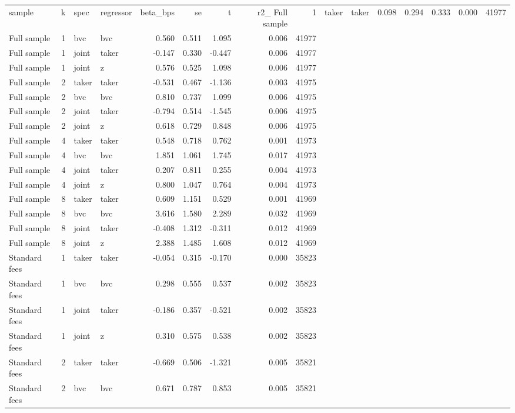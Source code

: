 \begin{tabular}{lrllrrrrr}
\toprule
sample & k & spec & regressor & beta_bps & se & t & r2_%
\midrule
Full sample & 1 & taker & taker & 0.098 & 0.294 & 0.333 & 0.000 & 41977 \\
Full sample & 1 & bvc & bvc & 0.560 & 0.511 & 1.095 & 0.006 & 41977 \\
Full sample & 1 & joint & taker & -0.147 & 0.330 & -0.447 & 0.006 & 41977 \\
Full sample & 1 & joint & z & 0.576 & 0.525 & 1.098 & 0.006 & 41977 \\
Full sample & 2 & taker & taker & -0.531 & 0.467 & -1.136 & 0.003 & 41975 \\
Full sample & 2 & bvc & bvc & 0.810 & 0.737 & 1.099 & 0.006 & 41975 \\
Full sample & 2 & joint & taker & -0.794 & 0.514 & -1.545 & 0.006 & 41975 \\
Full sample & 2 & joint & z & 0.618 & 0.729 & 0.848 & 0.006 & 41975 \\
Full sample & 4 & taker & taker & 0.548 & 0.718 & 0.762 & 0.001 & 41973 \\
Full sample & 4 & bvc & bvc & 1.851 & 1.061 & 1.745 & 0.017 & 41973 \\
Full sample & 4 & joint & taker & 0.207 & 0.811 & 0.255 & 0.004 & 41973 \\
Full sample & 4 & joint & z & 0.800 & 1.047 & 0.764 & 0.004 & 41973 \\
Full sample & 8 & taker & taker & 0.609 & 1.151 & 0.529 & 0.001 & 41969 \\
Full sample & 8 & bvc & bvc & 3.616 & 1.580 & 2.289 & 0.032 & 41969 \\
Full sample & 8 & joint & taker & -0.408 & 1.312 & -0.311 & 0.012 & 41969 \\
Full sample & 8 & joint & z & 2.388 & 1.485 & 1.608 & 0.012 & 41969 \\
Standard fees & 1 & taker & taker & -0.054 & 0.315 & -0.170 & 0.000 & 35823 \\
Standard fees & 1 & bvc & bvc & 0.298 & 0.555 & 0.537 & 0.002 & 35823 \\
Standard fees & 1 & joint & taker & -0.186 & 0.357 & -0.521 & 0.002 & 35823 \\
Standard fees & 1 & joint & z & 0.310 & 0.575 & 0.538 & 0.002 & 35823 \\
Standard fees & 2 & taker & taker & -0.669 & 0.506 & -1.321 & 0.005 & 35821 \\
Standard fees & 2 & bvc & bvc & 0.671 & 0.787 & 0.853 & 0.005 & 35821 \\

\end{tabular}
